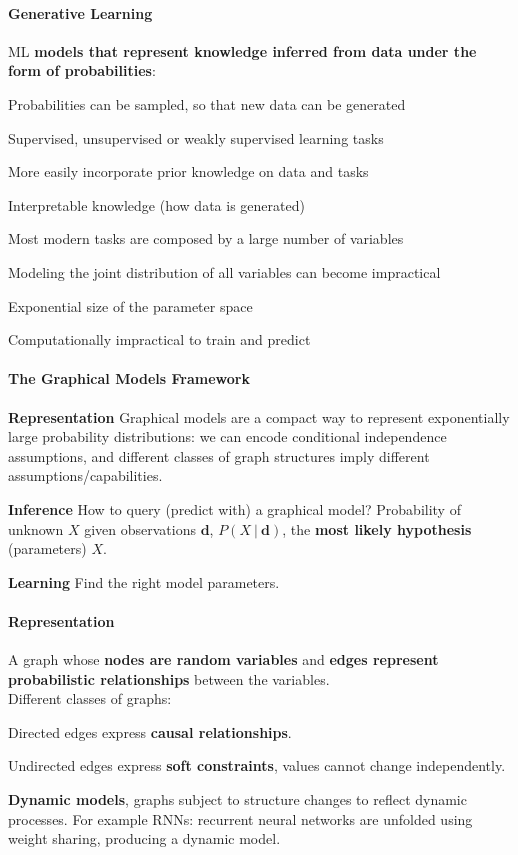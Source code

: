\documentclass[10pt]{report}
\begin{document}
\paragraph{Generative Learning} ML \textbf{models that represent knowledge inferred from data under the form of probabilities}:
\begin{list}{}{}
	\item Probabilities can be sampled, so that new data can be generated
	\item Supervised, unsupervised or weakly supervised learning tasks
	\item More easily incorporate prior knowledge on data and tasks
	\item Interpretable knowledge (how data is generated)
\end{list}
Most modern tasks are composed by a large number of variables
\begin{list}{}{}
	\item Modeling the joint distribution of all variables can become impractical
	\item Exponential size of the parameter space
	\item Computationally impractical to train and predict
\end{list}
\paragraph{The Graphical Models Framework}
\begin{list}{}{}
	\item \textbf{Representation} Graphical models are a compact way to represent exponentially large probability distributions: we can encode conditional independence assumptions, and different classes of graph structures imply different assumptions/capabilities.
	\item \textbf{Inference} How to query (predict with) a graphical model? Probability of unknown $X$ given observations $\mathbf{d}$, $P(X\:|\:\mathbf{d})$, the \textbf{most likely hypothesis} (parameters) $X$.
	\item \textbf{Learning} Find the right model parameters.
\end{list}
\paragraph{Representation} A graph whose \textbf{nodes are random variables} and \textbf{edges represent probabilistic relationships} between the variables.\\
Different classes of graphs:
\begin{list}{}{}
	\item Directed edges express \textbf{causal relationships}.
	\item Undirected edges express \textbf{soft constraints}, values cannot change independently.
	\item \textbf{Dynamic models}, graphs subject to structure changes to reflect dynamic processes. For example RNNs: recurrent neural networks are unfolded using weight sharing, producing a dynamic model.
\end{list}
\end{document}

